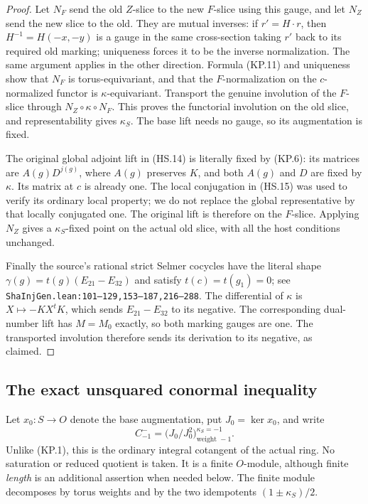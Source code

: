 \begin{proof}
Let $N_F$ send the old $Z$-slice to the new $F$-slice using
this gauge, and let $N_Z$ send the new slice to the old.
They are mutual inverses: if $r'=H\cdot r$, then
$H^{-1}=H(-x,-y)$ is a gauge in the same cross-section taking
$r'$ back to its required old marking; uniqueness forces it
to be the inverse normalization.  The same argument applies
in the other direction.  Formula (KP.11) and uniqueness show
that $N_F$ is torus-equivariant, and that the $F$-normalization
on the $c$-normalized functor is $\kappa$-equivariant.
Transport the genuine involution of the $F$-slice through
$N_Z\circ\kappa\circ N_F$.  This proves the functorial
involution on the old slice, and representability gives
$\kappa_S$.  The base lift needs no gauge, so its augmentation
is fixed.

The original global adjoint lift in (HS.14) is literally fixed by
(KP.6): its matrices are $A(g)D^{j(g)}$, where $A(g)$
preserves $K$, and both $A(g)$ and $D$ are fixed by $\kappa$.
Its matrix at $c$ is already one.  The local conjugation in
(HS.15) was used to verify its ordinary local property;
we do not replace the global representative by that locally
conjugated one.  The original lift is therefore on the
$F$-slice.  Applying $N_Z$ gives a $\kappa_S$-fixed point on
the actual old slice, with all the host conditions unchanged.

Finally the source's rational strict Selmer cocycles have
the literal shape $\gamma(g)=t(g)(E_{21}-E_{32})$ and satisfy
$t(c)=t(g_1)=0$; see
\texttt{ShaInjGen.lean:101--129,153--187,216--288}.
The differential of $\kappa$ is $X\mapsto-KX^tK$, which sends
$E_{21}-E_{32}$ to its negative.  The corresponding
dual-number lift has $M=M_0$ exactly, so both marking gauges
are one.  The transported involution therefore sends its
derivation to its negative, as claimed.
\end{proof}

\subsection{The exact unsquared conormal inequality}

Let $x_0:S\to O$ denote the base augmentation, put
$J_0=\ker x_0$, and write
\[
       C^-_{-1}=\bigl(J_0/J_0^2\bigr)_{\text{weight }-1}^{\kappa_S=-1}.
                                                                  \tag{KP.13}
\]
Unlike (KP.1), this is the ordinary integral cotangent of the
actual ring.  No saturation or reduced quotient is taken.
It is a finite $O$-module, although finite \emph{length} is an
additional assertion when needed below.  The finite module
decomposes by torus weights and by the two idempotents
$(1\pm\kappa_S)/2$.

